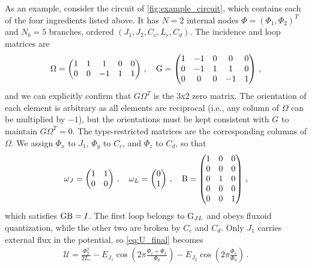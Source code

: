As an example, consider the circuit of \cref{fig:example_circuit}, which contains each of the four ingredients listed above.
It has $N=2$ internal nodes $\Phi=(\Phi_1,\Phi_2)^T$ and $N_b=5$ branches, ordered $(J_1,J_2,C_c,L_r,C_d)$.
The incidence and loop matrices are
\begin{align*}
    \Omega=\begin{pmatrix}
        1 & 1 & 1 & 0 & 0\\
        0 & 0 & -1 & 1 & 1
    \end{pmatrix}\,, \quad
    \mathrm{G}=\begin{pmatrix}
        1 & -1 & 0 & 0 & 0\\
        0 & -1 & 1 & 1 & 0\\
        0 & 0 & 0 & -1 & 1
    \end{pmatrix}\,,
\end{align*}
and we can explicitly confirm that $G\Omega^T$ is the 3x2 zero matrix.
The orientation of each element is arbitrary as all elements are reciprocal (i.e., any column of $\Omega$ can be multiplied by $-1$), but the orientations must be kept consistent with $G$ to maintain $G\Omega^T=0$.
The type-restricted matrices are the corresponding columns of $\Omega$.
We assign $\Phi_x$ to $J_1$, $\Phi_y$ to $C_c$, and $\Phi_z$ to $C_d$, so that
\begin{align*}
    \omega_J=\begin{pmatrix}1&1\\0&0\end{pmatrix}\,, \quad
    \omega_L=\begin{pmatrix}0\\1\end{pmatrix}\,, \quad
    \mathrm{B}=\begin{pmatrix}
        1 & 0 & 0\\
        0 & 0 & 0\\
        0 & 1 & 0\\
        0 & 0 & 0\\
        0 & 0 & 1
    \end{pmatrix}\,,
\end{align*}
which satisfies $\mathrm{G}\mathrm{B}=I$.
The first loop belongs to $\mathrm{G}_{JL}$ and obeys fluxoid quantization, while the other two are broken by $C_c$ and $C_d$.
Only $J_1$ carries external flux in the potential, so \cref{eq:U_final} becomes
\begin{align}
    \mathcal U=\frac{\Phi_2^2}{2L_r}-E_{J_1}\cos\left(2\pi\frac{\Phi_1+\Phi_x}{\Phi_0}\right)-E_{J_2}\cos\left(2\pi\frac{\Phi_1}{\Phi_0}\right)\,.
\end{align}
